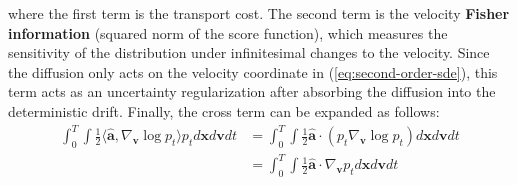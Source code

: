 \documentclass{article}
\begin{document}
where the first term is the transport cost. The second term is the velocity \textbf{Fisher information} (squared norm of the score function), which measures the sensitivity of the distribution under infinitesimal changes to the velocity. Since the diffusion only acts on the velocity coordinate in (\ref{eq:second-order-sde}), this term acts as an uncertainty regularization after absorbing the diffusion into the deterministic drift. Finally, the cross term can be expanded as follows:
\begin{align}
    \int_0^T\int \frac{1}{2}\langle \hat{\boldsymbol{a}}, \nabla_{\boldsymbol{v}}\log p_t\rangle p_td\boldsymbol{x}d\boldsymbol{v}dt&=\int_0^T\int\frac{1}{2}\hat{\boldsymbol{a}}\cdot (p_t\nabla_{\boldsymbol{v}}\log p_t)d\boldsymbol{x}d\boldsymbol{v}dt\nonumber\\
    &=\int_0^T\int\frac{1}{2}\hat{\boldsymbol{a}}\cdot \nabla_{\boldsymbol{v}}p_td\boldsymbol{x}d\boldsymbol{v}dt
\end{align}
\end{document}
